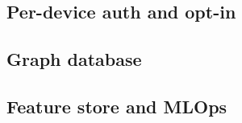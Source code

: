 \subsection{Per-device auth and opt-in}
\label{chapter4-user-side-opt-in}

\subsection{Graph database}
\label{chapter4-graph-database}

\subsection{Feature store and MLOps}
\label{chapter4-feature-store-and-mlops}

